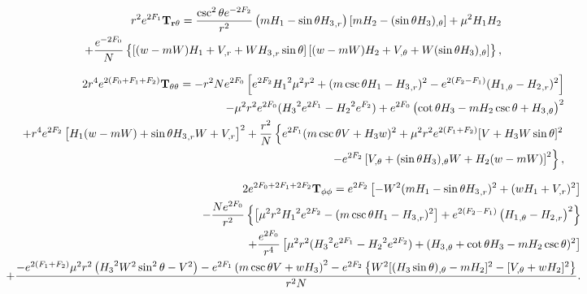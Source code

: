 \documentclass{article}
\numberwithin{equation}{section}
\begin{document}
 



\begin{eqnarray}
&&  r^2e^{2F_1}{\bf T_{r\theta}}= \frac{ \csc ^2\theta e^{-2 {F_2}}}{r^2} \left({m} {H_1}-\sin \theta {H_3}_{,r}\right) 
 \left[{m} {H_2}-(\sin\theta 
{H_3})_{,\theta}\right] +{\mu^2}  {H_1} 
{H_2}
 \nonumber \\
%
&&
+\frac{e^{-2 {F_0}}}{N} \left\{[ (w-{m}W) {H_1}+V_{,r}+ W{H_3}_{,r}\sin\theta ] \left[(w-{m}W) {H_2}+V_{,\theta}+W
(\sin\theta{H_3})_{,\theta}\right]
\right\},
\end{eqnarray}
  
  
 






\begin{eqnarray}
&& 2r^4e^{2(F_0+F_1+F_2)}{\bf T_{\theta\theta}}=-r^2 N e^{2 {F_0}} \left[e^{2 F_2} {H_1}^2 
{\mu^2} r^2 +( m\csc\theta H_1-{H_3}_{,r})^2  -e^{2( {F_2}-F_1)}( {H_1}_{,\theta}- 
{H_2}_{,r})^2\right] \nonumber \\
%
&&
-{\mu^2} r^2e^{2 {F_0}}({H_3}^2 e^{2 {F_1}}-{H_2}^2e^{F_2})
+e^{2 {F_0}} \left(\cot \theta {H_3}-m{H_2} \csc\theta+ {H_3}_{,\theta}\right)^2
 \nonumber \\
%
&&
+ r^4 e^{2 {F_2}} \left[
 {H_1} (w-{m} W)+ \sin\theta  {H_3}_{,r} W+
V_{,r} \right]^2
%
+\frac{r^2}{N} \left\{e^{2 {F_1}}({m} \csc\theta 
 V+{H_3}w)^2 +{\mu^2} r^2e^{2 ({F_1}+F_2)}[V+ {H_3} W \sin\theta]^2 
 \right. \nonumber \\
%
&&
\left.
-e^{2 {F_2}}\left[
V_{,\theta}+ (\sin\theta  
{H_3})_{,\theta} W+ 
{H_2} (w-{m} W)\right]^2\right\},
\end{eqnarray}
  
  
  
  
  

  
  
  
  
 \begin{eqnarray}
&& 2e^{2F_0+2F_1+2F_2}{\bf T_{\phi\phi}}=e^{2F_2}\left[ -W^2(m{H_1}  
- \sin\theta  
{H_3}_{,r} )^2
+(wH_1+V_{,r})^2\right] \nonumber \\
% 
&&
-\frac{N e^{2 {F_0}}}{r^2} \left\{\left[ {\mu^2} r^2 {H_1}^2 e^{2 {F_2}}
-({m} \csc \theta  {H_1}
-{H_3}_{,r})^2\right] +e^{2(
{F_2}-F_1)}\left( {H_1}_{,\theta}- 
{H_2}_{,r}\right)^2\right\}
\nonumber \\
%
&&
+ \frac{e^{2 F_0}}{r^4} \left[{\mu^2} 
r^2( {H_3}^2 e^{2 {F_1}}- {H_2}^2 e^{2
{F_2}}) + ({H_3}_{,\theta}+ \cot
\theta  {H_3}-mH_2\csc\theta)^2\right]  \nonumber \\
%
%
&&
+\frac{- e^{2 (F_1+{F_2})} {\mu^2} r^2\left({H_3}^2  W^2 \sin ^2\theta  - V^2\right) -e^{2 {F_1}}\left(
{m} \csc\theta 
 V +w{H_3}  \right)^2  -e^{2 {F_2}}\left\{W^2[(H_3\sin\theta)_{,\theta}-mH_2]^2-[V_{,\theta}+wH_2]^2\right\}}{r^2N} .
\nonumber \\
 && 
\end{eqnarray}  
  
\end{document}
